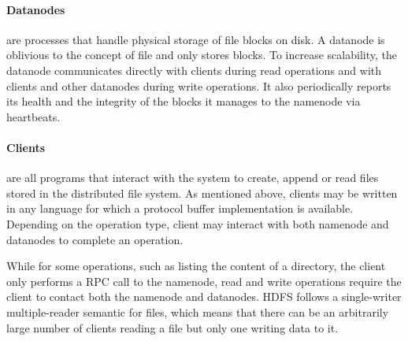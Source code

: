 \paragraph{Datanodes} are processes that handle physical storage of file blocks on disk.
A datanode is oblivious to the concept of file and only stores blocks.
To increase scalability, the datanode communicates directly with clients during read operations and with clients and other datanodes during write operations.
It also periodically reports its health and the integrity of the blocks it manages to the namenode via heartbeats.

\paragraph{Clients} are all programs that interact with the system to create, append or read files stored in the distributed file system.
As mentioned above, clients may be written in any language for which a protocol buffer implementation is available.
Depending on the operation type, client may interact with both namenode and datanodes to complete an operation.

While for some operations, such as listing the content of a directory, the client only performs a RPC call to the namenode, read and write operations require the client to contact both the namenode and datanodes.
HDFS follows a single-writer multiple-reader semantic for files, which means that there can be an arbitrarily large number of clients reading a file but only one writing data to it.

